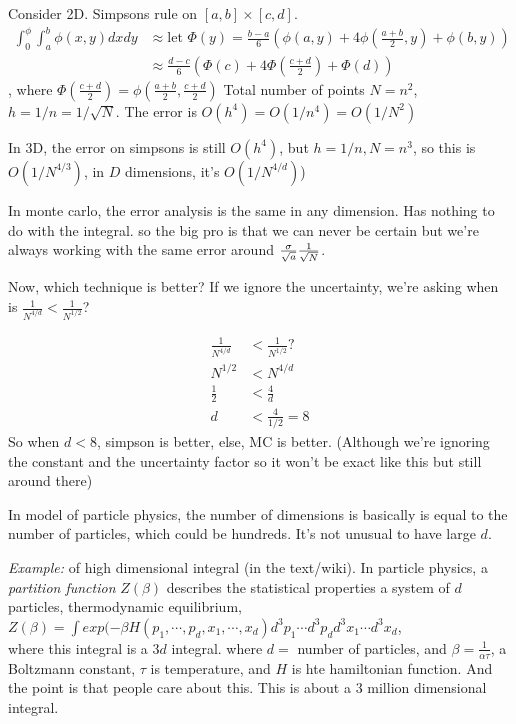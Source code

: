 Consider 2D. Simpsons rule on $[a,b]\times[c,d]$. 
\begin{align*}
\int_0^\phi\int_a^b\phi(x,y)dxdy &\approx \text{let } \Phi(y) = \frac{b-a}{6}(\phi(a,y)+4\phi(\frac{a+b}{2}, y) + \phi(b,y))\\
&\approx \frac{d-c}{6}(\Phi(c) + 4\Phi(\frac{c+d}{2}) + \Phi(d))
\end{align*}, where $\Phi(\frac{c+d}{2}) = \phi(\frac{a+b}{2}, \frac{c+d}{2})$
Total number of points $N=n^2$, $h=1/n = 1/\sqrt{N}$. The error is
$O(h^4)= O(1/n^4) = O(1/N^2)$

In 3D, the error on simpsons is still $O(h^4)$, but $h=1/n, N=n^3$, so
this is $O(1/N^{4/3})$, in $D$ dimensions, it's $O(1/N^{4/d})$)

In monte carlo, the error analysis is the same in any dimension. Has
nothing to do with the integral. so the big pro is that we can never
be certain but we're always working with the same error around
$\frac{\sigma}{\sqrt{a}}\frac{1}{\sqrt{N}}$.

Now, which technique is better? If we ignore the uncertainty, we're
asking when is $\frac{1}{N^{4/d}} < \frac{1}{N^{1/2}}$?

\begin{align*}
\frac{1}{N^{4/d}} &< \frac{1}{N^{1/2}}?\\
N^{1/2} &< N^{4/d}\\
\frac{1}{2} &<\frac{4}{d}\\
d &< \frac{4}{1/2} = 8
\end{align*}
So when $d<8$, simpson is better, else, MC is better. (Although we're
ignoring the constant and the uncertainty factor so it won't be exact
like this but still around there)

In model of particle physics, the number of dimensions is basically is
equal to the number of particles, which could be hundreds. It's not
unusual to have large $d$.

\emph{Example:} of high dimensional integral (in the text/wiki). In
particle physics, a \emph{partition function} $Z(\beta)$ describes the
statistical properties a system of $d$ particles, thermodynamic
equilibrium, \\$Z(\beta) = \int exp(-\beta H(p_1, \cdots, p_d, x_1,
\cdots, x_d)d^3p_1\cdots d^3p_dd^3x_1\cdots d^3x_d$, \\where this
integral is a $3d$ integral. where $d=$ number of particles, and
$\beta = \frac{1}{\alpha\tau}$, a Boltzmann constant, $\tau$ is
temperature, and $H$ is hte hamiltonian function. And the point is
that people care about this. This is about a 3 million dimensional
integral.

